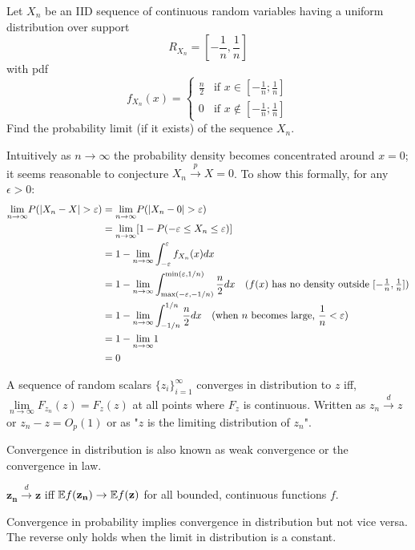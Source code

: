 \documentclass[DIV=14,titlepage=false]{scrreprt}
\begin{document}
\begin{exercise}
Let {$X_n$} be an IID sequence of continuous random variables having a uniform distribution over support \[ R_{X_n} = \left[ -\frac{1}{n}, \frac{1}{n} \right] \] with pdf \[ f_{X_n}(x) = 
\begin{cases} 
\frac{n}{2} & \text{if } x \in \left[-\frac{1}{n} ; \frac{1}{n}\right] \\
0 & \text{if } x \notin \left[-\frac{1}{n} ; \frac{1}{n}\right]
\end{cases}
\]
Find the probability limit (if it exists) of the sequence {$X_n$}. 
\end{exercise}
\begin{solution}
    Intuitively as $n\to \infty$ the probability density becomes concentrated around $x=0$; it seems reasonable to conjecture $X_n \overset{p}{\to} X=0$. To show this formally, for any $\epsilon>0$:
    \begin{align*}
        \underset{ n \to \infty}{\lim} P(|X_n-X|>\epsilon) &= \underset{ n \to \infty}{\lim} P(|X_n-0|>\epsilon)\\
        &= \underset{ n \to \infty}{\lim} [1-P(-\epsilon \leq X_n \leq \epsilon)]\\
        &= 1- \underset{ n \to \infty}{\lim} \int_{-\epsilon}^{\epsilon} f_{X_n}(x)dx\\
        &= 1- \underset{ n \to \infty}{\lim} \int_{\max(-\epsilon,-1/n)}^{\min(\epsilon, 1/n)} \frac{n}{2}dx \quad \text{($f(x)$ has no density outside $ [-\tfrac{1}{n}, \tfrac{1}{n}]$)}\\
        &= 1- \underset{ n \to \infty}{\lim} \int_{-1/n}^{1/n} \frac{n}{2}dx \quad \text{(when $n$ becomes large, $\frac{1}{n}<\epsilon$)}\\
        &= 1- \underset{ n \to \infty}{\lim}1\\
        &=0
    \end{align*}

\end{solution}

\begin{definition}
    A sequence of random scalars $\{ z_i \}_{i=1}^{\infty}$ converges in distribution to $z$ iff, $\underset{ n \to \infty}{\lim} F_{z_n}(z) = F_z (z)$ at all points where $F_z$ is continuous. Written as $z_n \overset{d}{\to} z$ or $z_n - z = O_p(1)$ or as "$z$ is the limiting distribution of $z_n$".
\end{definition}

Convergence in distribution is also known as weak convergence or the convergence in law. 
\begin{theorem}
    $\mathbf{z_n} \overset{d}{\to} \mathbf{z}$ iff $\mathbb{E} f(\mathbf{z_n}) \to \mathbb{E} f(\mathbf{z})$ for all bounded, continuous functions $ f$.
\end{theorem}
\begin{claim}
Convergence in probability implies convergence in distribution but not vice versa. The reverse only holds when the limit in distribution is a constant.
\end{claim}
\end{document}
